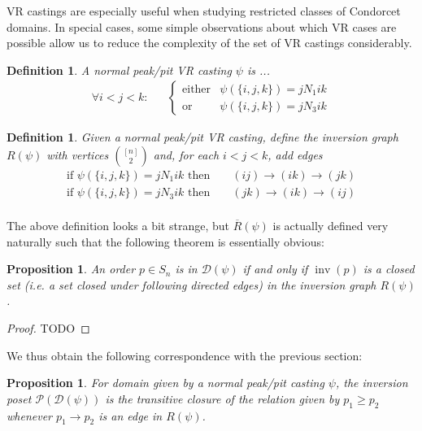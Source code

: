 \documentclass[12pt]{article}
\newtheorem{definition}[theorem]{Definition}
\newtheorem{proposition}[theorem]{Proposition}
\newcommand{\D}{\mathcal{D}}
\newcommand{\PP}{\mathcal{P}}
\DeclareMathOperator*{\inv}{inv}
\newcommand{\1}[1]{\mathds{1}[{#1}]}
\begin{document}
  VR castings are especially useful when studying restricted classes of
  Condorcet domains. In special cases, some simple observations about which VR
  cases are possible allow us to reduce the complexity of the set of VR castings
  considerably.

  \begin{definition}
    A normal peak/pit VR casting $\psi$ is ...
    \begin{align*}
      \forall i<j<k:
      &&
      \begin{cases}
        \text{either} &  \psi(\{i,j,k\}) = j N_1 ik \\
        \text{or} &  \psi(\{i,j,k\}) = j N_3 ik
      \end{cases}
    \end{align*}
  \end{definition}
  \begin{definition}
    Given a normal peak/pit VR casting, define the inversion graph $R(\psi)$
    with vertices $[n] \choose 2$ and, for each $i<j<k$, add edges
    \begin{align*}
      \text{if $\psi(\{i,j,k\}) = j N_1 ik$ then }
      && (ij) \longrightarrow (ik) \longrightarrow (jk) \\
      \text{if $\psi(\{i,j,k\}) = j N_3 ik$ then }
      && (jk) \longrightarrow (ik) \longrightarrow (ij) \\
    \end{align*}
  \end{definition}

  The above definition looks a bit strange, but $\overline R(\psi)$ 
  is actually defined very naturally such that the following theorem is
  essentially obvious:

  \begin{proposition}
    An order $p \in S_n$ is in $\D(\psi)$ if and only if $\inv(p)$
    is a closed set (i.e. a set closed under following directed edges)
    in the inversion graph $R(\psi)$.
  \end{proposition}
  \begin{proof}
    TODO
  \end{proof}

  We thus obtain the following correspondence with the previous section:
  \begin{proposition}
    For domain given by a normal peak/pit casting $\psi$,
    the inversion poset $\PP(\D(\psi))$ is the transitive closure of the relation
    given by $p_1 \ge p_2$ whenever $p_1\longrightarrow p_2$ is an edge in 
    $R(\psi)$.
  \end{proposition}
\end{document}

